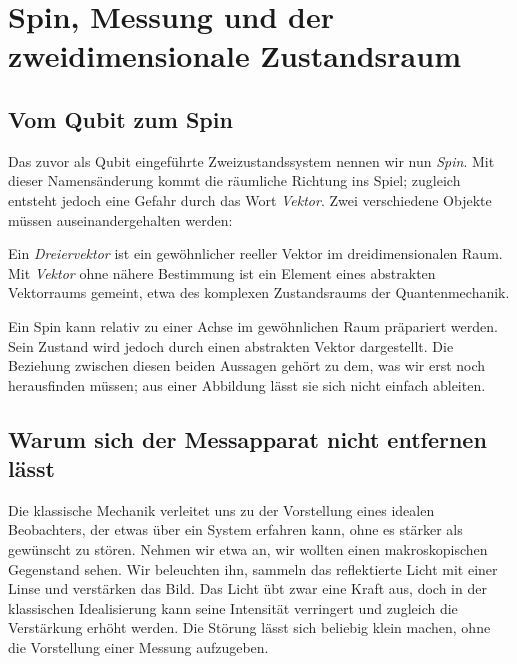 \chapter{Spin, Messung und der zweidimensionale Zustandsraum}


\section{Vom Qubit zum Spin}

Das zuvor als Qubit eingeführte Zweizustandssystem nennen wir nun \emph{Spin}. Mit dieser Namensänderung kommt die räumliche Richtung ins Spiel; zugleich entsteht jedoch eine Gefahr durch das Wort \emph{Vektor}. Zwei verschiedene Objekte müssen auseinandergehalten werden:

\begin{definition}
Ein \emph{Dreiervektor} ist ein gewöhnlicher reeller Vektor im dreidimensionalen Raum. Mit \emph{Vektor} ohne nähere Bestimmung ist ein Element eines abstrakten Vektorraums gemeint, etwa des komplexen Zustandsraums der Quantenmechanik.
\end{definition}

Ein Spin kann relativ zu einer Achse im gewöhnlichen Raum präpariert werden. Sein Zustand wird jedoch durch einen abstrakten Vektor dargestellt. Die Beziehung zwischen diesen beiden Aussagen gehört zu dem, was wir erst noch herausfinden müssen; aus einer Abbildung lässt sie sich nicht einfach ableiten.

\section{Warum sich der Messapparat nicht entfernen lässt}

Die klassische Mechanik verleitet uns zu der Vorstellung eines idealen Beobachters, der etwas über ein System erfahren kann, ohne es stärker als gewünscht zu stören. Nehmen wir etwa an, wir wollten einen makroskopischen Gegenstand sehen. Wir beleuchten ihn, sammeln das reflektierte Licht mit einer Linse und verstärken das Bild. Das Licht übt zwar eine Kraft aus, doch in der klassischen Idealisierung kann seine Intensität verringert und zugleich die Verstärkung erhöht werden. Die Störung lässt sich beliebig klein machen, ohne die Vorstellung einer Messung aufzugeben.


